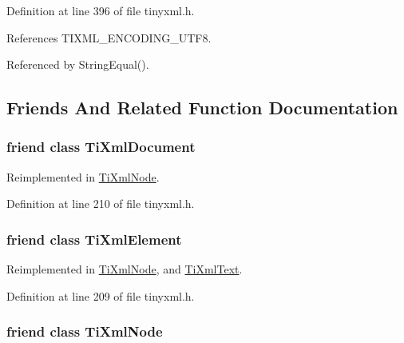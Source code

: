 Definition at line 396 of file tinyxml.h.

References TIXML\_\-ENCODING\_\-UTF8.

Referenced by StringEqual().

\subsection{Friends And Related Function Documentation}
\hypertarget{class_ti_xml_base_a173617f6dfe902cf484ce5552b950475}{
\subsubsection[{TiXmlDocument}]{\setlength{\rightskip}{0pt plus 5cm}friend class {\bf TiXmlDocument}}}
\label{class_ti_xml_base_a173617f6dfe902cf484ce5552b950475}


Reimplemented in \hyperlink{class_ti_xml_node_a173617f6dfe902cf484ce5552b950475}{TiXmlNode}.

Definition at line 210 of file tinyxml.h.\hypertarget{class_ti_xml_base_ab6592e32cb9132be517cc12a70564c4b}{
\subsubsection[{TiXmlElement}]{\setlength{\rightskip}{0pt plus 5cm}friend class {\bf TiXmlElement}}}
\label{class_ti_xml_base_ab6592e32cb9132be517cc12a70564c4b}


Reimplemented in \hyperlink{class_ti_xml_node_ab6592e32cb9132be517cc12a70564c4b}{TiXmlNode}, and \hyperlink{class_ti_xml_text_ab6592e32cb9132be517cc12a70564c4b}{TiXmlText}.

Definition at line 209 of file tinyxml.h.\hypertarget{class_ti_xml_base_a218872a0d985ae30e78c55adc4bdb196}{
\subsubsection[{TiXmlNode}]{\setlength{\rightskip}{0pt plus 5cm}friend class {\bf TiXmlNode}}}
\label{class_ti_xml_base_a218872a0d985ae30e78c55adc4bdb196}


